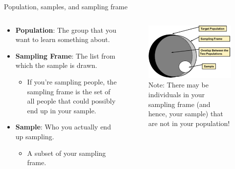 \documentclass[aspectratio=169]{../latex_main/tntbeamer}  %
\begin{document}
	
		\begin{frame}{Population, samples, and sampling frame}
	    \begin{columns}
	        \begin{column}{.4\textwidth}
         
	            \begin{itemize}
	                \item \textbf{Population}: The group that you want to learn something about.
                    \item \textbf{Sampling Frame}: The list from which the sample is drawn.
                    \begin{itemize}
                        \item If you’re sampling people, the sampling frame is the set of all people that could possibly end up in your sample.
                    \end{itemize}
                    \item \textbf{Sample}: Who you actually end up sampling. 
                    \begin{itemize}
                        \item A subset of your sampling frame.
                    \end{itemize}
	            \end{itemize}
	        \end{column}
	        
	        \begin{column}{.4\textwidth}

                \vspace*{-2em}
                \begin{figure}
                    \centering
                    \includegraphics[scale=.7]{Bild13}\\
                    Note: There may be individuals in your sampling frame (and hence, your sample) that are not in your population!

                \end{figure}
	        \end{column}
	        
	    \end{columns}
	    
	\end{frame}
	
\end{document}
